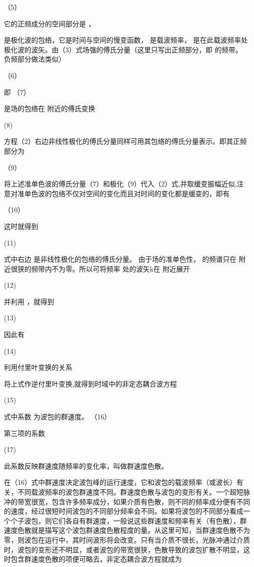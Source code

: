                             （5）

它的正频成分的空间部分是
     ，

是极化波的包络，它是时间与空间的慢变函数， 是载波频率， 是在此载波频率处极化波的波矢。由（3）式场强的傅氏分量（这里只写出正频部分，即 的频带。 负频部分做法类似）

                               （6）

  即                           （7）

  是场的包络在 附近的傅氏变换

                      (8)       

方程（2）右边非线性极化的傅氏分量同样可用其包络的傅氏分量表示。即其正频部分为

                               （9）

将上述准单色波的傅氏分量（7）和极化（9）代入（2）式,并取缓变振幅近似,注意对准单色波的包络不仅对空间的变化而且对时间的变化都是缓变的，即有

                                     （10）
                                     
这时就得到

                 (11)

式中右边 是非线性极化的包络的傅氏分量。 由于场的准单色性， 的频谱只在 附近很狭的频带内不为零。所以可将频率 处的波矢k在 附近展开

                              (12)

并利用 ，就得到

                 (13)

因此有

          (14)

利用付里叶变换的关系

          
将上式作逆付里叶变换,就得到时域中的非定态耦合波方程

                 (15)

式中系数        为波包的群速度。              （16）

第三项的系数

                       (17)

此系数反映群速度随频率的变化率，叫做群速度色散。

在（16）式中群速度决定波包峰的运行速度，它和波包的载波频率（或波长）有关，不同载波频率的波包群速度不同。群速度色散与波包的变形有关。一个超短脉冲的带宽很宽，包含许多频率成分，如果介质有色散，则不同的频率成分便有不同的速度，经过很短时间波包的不同部分频率会不同。如果将波包的不同部分看成一个个子波包，则它们各自有群速度，一般说这些群速度和频率有关（有色散），群速度色散就是描写这个波包群速度色散程度的量。从这里可知，当群速度色散不为零，则波包在运行中，其时间波形将会改变。只有当介质不很长，光脉冲通过介质时，波包的变形还不明显，或者波包的带宽很狭，色散导致的波包扩散不明显，这时包含群速度色散的项便可略去，非定态耦合波方程就成为

